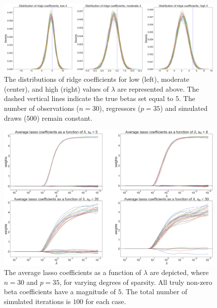 \begin{figure}[H]
        \includegraphics[scale=0.17]{material/Img/ridge_shrunken_beta_dist_35.png}
        \centering
        \caption[Distribution of ridge coefficients]{The distributions of ridge coefficients for low (left), moderate (center), and high (right) values of $\lambda$ are represented above. The dashed vertical lines indicate the true betas set equal to $5$. The number of observations ($n=30$), regressors ($p = 35$) and simulated draws ($500$) remain constant.}
\label{fig:ridge_shrunken_betas}
\end{figure}

\begin{figure}[H]
        \includegraphics[scale=0.2]{material/Img/average_lasso_plot_betas.png}
        \centering
        \caption[Average lasso coefficients as a function of $\lambda$]{The average lasso coefficients as a function of $\lambda$ are depicted, where $n=30$ and $p=35$, for varying degrees of sparsity. All truly non-zero beta coefficients have a magnitude of $5$. The total number of simulated iterations is $100$ for each case.}
\label{fig:avg_lasso_betas}
\end{figure}
    
